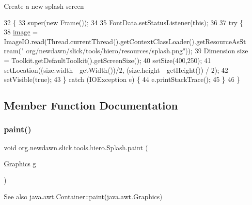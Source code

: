 Create a new splash screen 
\begin{DoxyCode}
32              \{
33         super(\textcolor{keyword}{new} Frame());
34         
35         FontData.setStatusListener(\textcolor{keyword}{this});
36         
37         \textcolor{keywordflow}{try} \{
38             \mbox{\hyperlink{classorg_1_1newdawn_1_1slick_1_1tools_1_1hiero_1_1_splash_aa7f9bf57a1205b3ed105ae9392f17cff}{image}} = ImageIO.read(Thread.currentThread().getContextClassLoader().getResourceAsStream(\textcolor{stringliteral}{"
      org/newdawn/slick/tools/hiero/resources/splash.png"}));
39             Dimension size = Toolkit.getDefaultToolkit().getScreenSize();
40             setSize(400,250);
41             setLocation((size.width - getWidth())/2, (size.height - getHeight()) / 2);
42             setVisible(\textcolor{keyword}{true});
43         \} \textcolor{keywordflow}{catch} (IOException e) \{
44             e.printStackTrace();
45         \}
46     \}
\end{DoxyCode}


\subsection{Member Function Documentation}
\mbox{\label{classorg_1_1newdawn_1_1slick_1_1tools_1_1hiero_1_1_splash_accda1ecae214ca97c121caf5de258c0d}} 
\subsubsection{\texorpdfstring{paint()}{paint()}}
{\footnotesize\ttfamily void org.\+newdawn.\+slick.\+tools.\+hiero.\+Splash.\+paint (\begin{DoxyParamCaption}\item[{\mbox{\hyperlink{classorg_1_1newdawn_1_1slick_1_1_graphics}{Graphics}}}]{g }\end{DoxyParamCaption})\hspace{0.3cm}{\ttfamily [inline]}}

\begin{DoxySeeAlso}{See also}
java.\+awt.\+Container\+::paint(java.\+awt.\+Graphics) 
\end{DoxySeeAlso}

